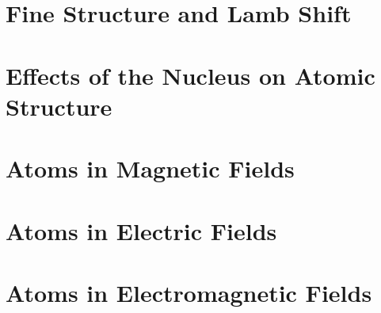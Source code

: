 \documentclass{book}
\theoremstyle{definition}
\begin{document}


\chapter{Fine Structure and Lamb Shift}
















\chapter{Effects of the Nucleus on Atomic Structure}














\chapter{Atoms in Magnetic Fields}












\chapter{Atoms in Electric Fields}










\chapter{Atoms in Electromagnetic Fields}
\end{document}
